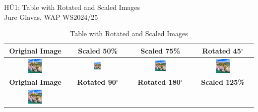 \documentclass[a4paper,12pt]{article}
\begin{document}
\begin{center}
{\LARGE H\"U1: Table with Rotated and Scaled Images}\\
{\large Jure Glavas, WAP WS2024/25}
\end{center}

\begin{table}[h!]
    \centering
    \caption{Table with Rotated and Scaled Images}
    \begin{tabular}{|c|c|c|c|}
        \hline
        \textbf{Original Image} & \textbf{Scaled 50\%} & \textbf{Scaled 75\%} & \textbf{Rotated 45$^\circ$} \\
        \hline
        \includegraphics[width=0.25\textwidth]{rovinj.png} &
        \includegraphics[width=0.125\textwidth]{rovinj.png} &
        \includegraphics[width=0.1875\textwidth]{rovinj.png} &
        \includegraphics[width=0.25\textwidth, angle=45]{rovinj.png} \\
        \hline
        \textbf{Original Image} & \textbf{Rotated 90$^\circ$} & \textbf{Rotated 180$^\circ$} & \textbf{Scaled 125\%} \\
        \hline
        \includegraphics[width=0.25\textwidth]{rovinj.png} &

\end{tabular}
\end{table}
\end{document}
